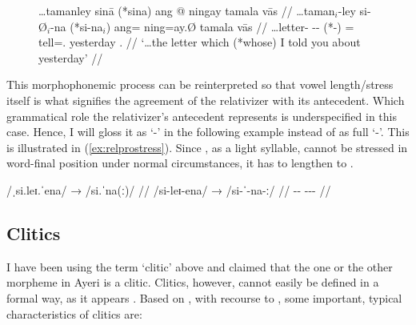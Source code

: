 \begin{figure}
\ex\label{ex:relpromorphphon}
\begingl
	\gla \dots tamanley sinā \textup{(}*sina\textup{)} ang @ ningay tamala
		vās //
	\glb \dots taman$_i$-ley si-Ø$_i$-na (*si-na$_i$) ang= ning=ay.Ø tamala vās //
	\glc \dots letter-\PargI{} \Rel{}-\PatTI{}-\Gen{} (*\Rel{}-\Gen{}) \AgtT{}= 
		tell=\Fsg{}.\Top{} yesterday \Ssg{}.\Parg{} //
	\glft `\dots the letter which (*whose) I told you about yesterday' //
\endgl\xe
\end{figure}

This morphophonemic process can be reinterpreted so that vowel length/stress itself is what signifies
the agreement of the relativizer with its antecedent. Which grammatical role
the relativizer's antecedent represents is
underspecified in this case. Hence, I will gloss it as `-\Agr{}' in the following example
instead of as full `-\PargI{}'. This is illustrated in (\ref{ex:relprostress}).
Since , as a light syllable, cannot be stressed in word-final
position under normal circumstances, it has to lengthen to .

\ex[everygla=\upshape]\label{ex:relprostress}%
\begingl
	\gla /ˌsi.leɪ.ˈena/ → /si.ˈna(ː)/ //
	\glb /si-leɪ-ena/ → /si-ˈ-na-ː/ //
	\glc \Rel{}-\PargI{}-\Gen{} {} \Rel{}-\Agr{}-\Gen{}-\Agr{} //
\endgl\xe


\subsection{Clitics}
\label{subsec:clitics}

I have been using the term `clitic' above and claimed that the one or the other
morpheme in Ayeri is a clitic. Clitics, however, cannot easily be defined in a
formal way, as it appears \citep[126]{spencerluis2012}. Based on
\citet{spencerluis2012}, with recourse to \citet{zwickypullum1983}, some
important, typical characteristics of clitics are:

